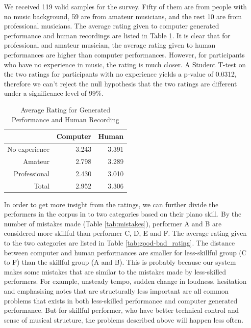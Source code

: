 

We received 119 valid samples for the survey. Fifty of them are from people with no music background, 59 are from amateur musicians, and the rest 10 are from professional musicians. The average rating given to computer generated performance and human recordings are listed in Table \ref{tab:avg_rating}. It is clear that for professional and amateur musician, the average rating given to human performances are higher than computer performances. However, for participants who have no experience in music, the rating is much closer. A Student T-test on the two ratings for participants with no experience yields a p-value of 0.0312, therefore we can't reject the null hypothesis that the two ratings are different under a significance level of 99\%.

\begin{table}
   \centering
   \caption{Average Rating for Generated Performance and Human Recording}
   \label{tab:avg_rating}
   \begin{tabular}{r|rr}
      \hline
      &Computer &Human \\
      \hline
      No experience&3.243&3.391\\
      Amateur&2.798&3.289\\
      Professional&2.430&3.010\\
      \hline
      Total&2.952&3.306\\
      \hline
   \end{tabular}
\end{table}

In order to get more insight from the ratings, we can further divide the performers in the corpus in to two categories based on their piano skill. By the number of mistakes made (Table \ref{tab:mistakes}), performer A and B are considered more skillful than performer C, D, E and F. The average rating given to the two categories are listed in Table \ref{tab:good-bad_rating}. The distance between computer and human performances are smaller for less-skillful group (C to F) than the skillful group (A and B). This is probably because our system makes some mistakes that are similar to the mistakes made by less-skilled performers. For example, unsteady tempo, sudden change in loudness, hesitation and emphasising notes that are structurally less important are all common problems that exists in both less-skilled performance and computer generated performance. But for skillful performer, who have better technical control and sense of musical structure, the problems described above will happen less often. %

